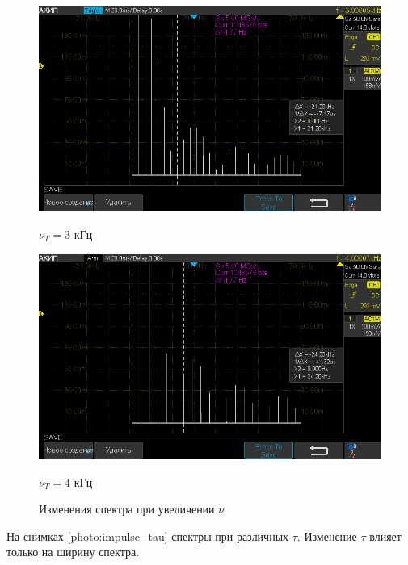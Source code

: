 \begin{figure}[H]
	\centering
	\begin{minipage}[b]{.5\textwidth}
		\vspace*{-15pt}
		\centering
		\includegraphics[width=0.9\linewidth]{"../photos/impulse3.png"}
		\vspace*{-5pt}
		\caption*{$\nu_T= 3$ кГц}
		\vspace*{-10pt}
	\end{minipage}%
	\begin{minipage}[b]{.5\textwidth}
		\vspace*{-15pt}
		\centering
		\includegraphics[width=0.9\linewidth]{"../photos/impulse4.png"}
		\vspace*{-5pt}
		\caption*{$\nu_T= 4$ кГц}
		\vspace*{-10pt}
	\end{minipage}
	\caption{Изменения спектра при увеличении $\nu$}
	\label{photo:impulse_nu}
\end{figure}

На снимках \ref{photo:impulse_tau} спектры при различных $\tau$. Изменение $\tau$ влияет только на ширину спектра.

